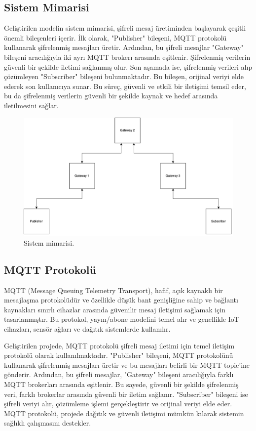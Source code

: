\documentclass[conference, a4paper]{IEEEtran}
\begin{document}
	\subsection{Sistem Mimarisi}

    Geliştirilen modelin sistem mimarisi, şifreli mesaj üretiminden başlayarak çeşitli önemli bileşenleri içerir. İlk olarak, "Publisher" bileşeni, MQTT protokolü kullanarak şifrelenmiş mesajları üretir. Ardından, bu şifreli mesajlar "Gateway" bileşeni aracılığıyla iki ayrı MQTT brokerı arasında eşitlenir. Şifrelenmiş verilerin güvenli bir şekilde iletimi sağlanmış olur. Son aşamada ise, şifrelenmiş verileri alıp çözümleyen "Subscriber" bileşeni bulunmaktadır. Bu bileşen, orijinal veriyi elde ederek son kullanıcıya sunar. Bu süreç, güvenli ve etkili bir iletişimi temsil eder, bu da şifrelenmiş verilerin güvenli bir şekilde kaynak ve hedef arasında iletilmesini sağlar.

\begin{figure}[H]
    \centering
    \shorthandoff{=}  
    \includegraphics[scale=1.00]{fig1.png}
    \shorthandon{=} 
    \caption{Sistem mimarisi.}
    \label{sekil1}
\end{figure}

	\subsection{MQTT Protokolü}
    MQTT (Message Queuing Telemetry Transport), hafif, açık kaynaklı bir mesajlaşma protokolüdür ve özellikle düşük bant genişliğine sahip ve bağlantı kaynakları sınırlı cihazlar arasında güvenilir mesaj iletişimi sağlamak için tasarlanmıştır. Bu protokol, yayın/abone modelini temel alır ve genellikle IoT cihazları, sensör ağları ve dağıtık sistemlerde kullanılır.
    
    Geliştirilen projede, MQTT protokolü şifreli mesaj iletimi için temel iletişim protokolü olarak kullanılmaktadır. "Publisher" bileşeni, MQTT protokolünü kullanarak şifrelenmiş mesajları üretir ve bu mesajları belirli bir MQTT topic'ine gönderir. Ardından, bu şifreli mesajlar, "Gateway" bileşeni aracılığıyla farklı MQTT brokerları arasında eşitlenir. Bu sayede, güvenli bir şekilde şifrelenmiş veri, farklı brokerlar arasında güvenli bir iletim sağlanır. "Subscriber" bileşeni ise şifreli veriyi alır, çözümleme işlemi gerçekleştirir ve orijinal veriyi elde eder. MQTT protokolü, projede dağıtık ve güvenli iletişimi mümkün kılarak sistemin sağlıklı çalışmasını destekler.
\end{document}
